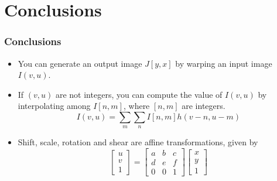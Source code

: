 \documentclass{beamer}
\begin{document}
\section{Conclusions}
\setcounter{subsection}{1}
\begin{frame}
  \frametitle{Conclusions}
  \begin{itemize}
  \item You can generate an output image $J[y,x]$ by warping an input image $I(v,u)$.
  \item If $(v,u)$ are not integers, you can compute the value of $I(v,u)$ by interpolating
    among $I[n,m]$, where $[n,m]$ are integers.
    \[
    I(v,u) = \sum_m\sum_n I[n,m] h(v-n,u-m)
    \]
  \item Shift, scale, rotation and shear are affine transformations, given by
  \[
  \left[\begin{array}{c} u\\v\\1\end{array}\right]=
  \left[\begin{array}{ccc}a&b&c\\d&e&f\\0&0&1\end{array}\right]
  \left[\begin{array}{c}x\\y\\1\end{array}\right]
  \]
  \end{itemize}
\end{frame}
\end{document}
